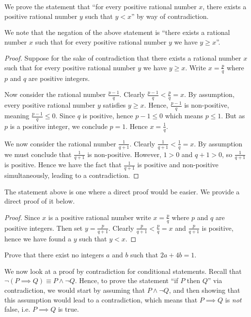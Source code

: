 \begin{example}
    We prove the statement that ``for every positive rational number $x$, there exists a positive rational number $y$ such that $y < x$'' by way of contradiction.
    
    We note that the negation of the above statement is ``there exists a rational number $x$ such that for every positive rational number $y$ we have $y \geq x$''.
    \begin{proof}
        Suppose for the sake of contradiction that there exists a rational number $x$ such that for every positive rational number $y$ we have $y \geq x$. Write $x = \frac pq$ where $p$ and $q$ are positive integers.
        
        Now consider the rational number $\frac{p-1}{q}$. Clearly $\frac{p-1}{q} < \frac pq = x$. By assumption, every positive rational number $y$ satisfies $y \geq x$. Hence, $\frac{p-1}{q}$ is non-positive, meaning $\frac{p-1}{q} \leq 0$. Since $q$ is positive, hence $p - 1 \leq 0$ which means $p \leq 1$. But as $p$ is a positive integer, we conclude $p = 1$. Hence $x = \frac 1q$.
        
        We now consider the rational number $\frac{1}{q+1}$. Clearly $\frac{1}{q+1} < \frac{1}{q} = x$. By assumption we must conclude that $\frac{1}{q+1}$ is non-positive. However, $1 > 0$ and $q + 1 > 0$, so $\frac{1}{q+1}$ is positive. Hence we have the fact that $\frac{1}{q+1}$ is positive and non-positive simultaneously, leading to a contradiction.
    \end{proof}
\end{example}
\begin{remark}
    The statement above is one where a direct proof would be easier. We provide a direct proof of it below.
    \begin{proof}
        Since $x$ is a positive rational number write $x = \frac pq$ where $p$ and $q$ are positive integers. Then set $y = \frac{p}{q+1}$. Clearly $\frac{p}{q+1} < \frac{p}{q} = x$ and $\frac{p}{q+1}$ is positive, hence we have found a $y$ such that $y < x$.
    \end{proof}
\end{remark}

\begin{exercise}
    Prove that there exist no integers $a$ and $b$ such that $2a + 4b = 1$.
\end{exercise}

We now look at a proof by contradiction for conditional statements. Recall that $\lnot(P \implies Q) \equiv P \land \lnot Q$. Hence, to prove the statement ``if $P$ then $Q$'' via contradiction, we would start by assuming that $P \land \lnot Q$, and then showing that this assumption would lead to a contradiction, which means that $P \implies Q$ is \textit{not} false, i.e. $P\implies Q$ is true.

